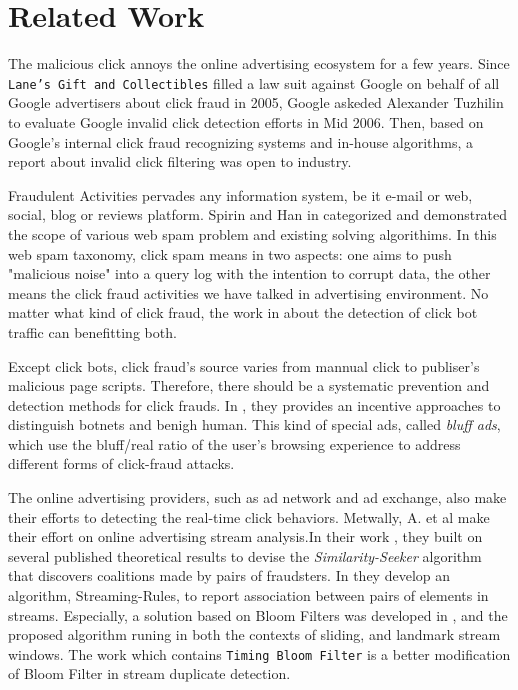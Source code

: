 \documentclass[runningheads,report]{llncs}
\begin{document}
\section{Related Work}

The malicious click annoys the online advertising ecosystem for a few years. Since \texttt{Lane's Gift and Collectibles} filled a law suit against Google on behalf of all Google advertisers about click fraud in 2005, Google askeded Alexander Tuzhilin to evaluate Google invalid click detection efforts in Mid 2006. Then, based on Google's internal click fraud recognizing systems and in-house algorithms, a report about invalid click filtering \cite{website:GoogleReport} was open to industry.

Fraudulent Activities pervades any information system, be it e-mail or web, social, blog or reviews platform. Spirin and Han in \cite{DBLP:journals/sigkdd/SpirinH11} categorized and demonstrated the scope of various web spam problem and existing solving algorithims. In this web spam taxonomy, click spam means in two aspects: one aims to push "malicious noise" into a query log with the intention to corrupt data, the other means the click fraud activities we have talked in advertising environment. No matter what kind of click fraud, the work in \cite{DBLP:conf/wsdm/YuXK10} about the detection of click bot traffic can benefitting both.

Except click bots, click fraud's source varies from mannual click to publiser's malicious page scripts. Therefore, there should be a systematic prevention and detection methods for click frauds. In \cite{DBLP:journals/ccr/Haddadi10}, they provides an incentive approaches to distinguish botnets and benigh human. This kind of special ads, called \textit{bluff ads}, which use the bluff/real ratio of the user's browsing experience to address different forms of click-fraud attacks.

The online advertising providers, such as ad network and ad exchange, also make their efforts to detecting the real-time click behaviors. Metwally, A. et al make their effort on online advertising stream analysis.In their work \cite{DBLP:conf/www/MetwallyAA07}, they built on several published theoretical results to devise the \textit{Similarity-Seeker} algorithm that discovers coalitions made by pairs of fraudsters. In \cite{DBLP:conf/vldb/MetwallyAA05} they develop an algorithm, Streaming-Rules, to report association between pairs of elements in streams. Especially, a solution based on Bloom Filters was developed in \cite{DBLP:conf/www/MetwallyAA05}, and the proposed algorithm runing in both the contexts of sliding, and landmark stream windows. The work \cite{DBLP:conf/icdcs/ZhangG08} which contains \texttt{Timing Bloom Filter} is a better modification of Bloom Filter in stream duplicate detection.
\end{document}
